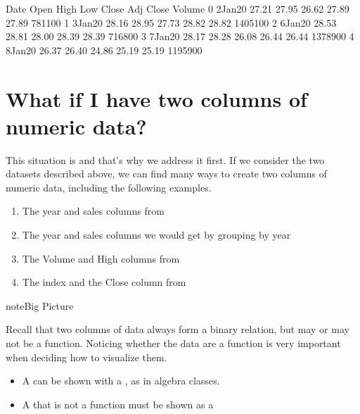 \documentclass[letterpaper,10pt,english]{sphinxmanual}
\begin{document}
\begin{sphinxVerbatim}[commandchars=\\\{\}]
       Date   Open   High    Low  Close  Adj Close   Volume
0  2\PYGZhy{}Jan\PYGZhy{}20  27.21  27.95  26.62  27.89      27.89   781100
1  3\PYGZhy{}Jan\PYGZhy{}20  28.16  28.95  27.73  28.82      28.82  1405100
2  6\PYGZhy{}Jan\PYGZhy{}20  28.53  28.81  28.00  28.39      28.39   716800
3  7\PYGZhy{}Jan\PYGZhy{}20  28.17  28.28  26.08  26.44      26.44  1378900
4  8\PYGZhy{}Jan\PYGZhy{}20  26.37  26.40  24.86  25.19      25.19  1195900
\end{sphinxVerbatim}


\section{What if I have two columns of numeric data?}
\label{\detokenize{chapter-10-visualization:what-if-i-have-two-columns-of-numeric-data}}
This situation is  and that’s why we address it first.  If we consider the two datasets described above, we can find many ways to create two columns of numeric data, including the following examples.
\begin{enumerate}
%
\item {} 
The year and sales columns from 

\item {} 
The year and sales columns we would get by grouping  by year

\item {} 
The Volume and High columns from 

\item {} 
The index and the Close column from 

\end{enumerate}

\begin{sphinxadmonition}{note}{Big Picture}

Recall that two columns of data always form a binary relation, but may or may not be a function.  Noticing whether the data are a function is very important when deciding how to visualize them.
\begin{itemize}
\item {} 
A  can be shown with a , as in algebra classes.

\item {} 
A  that is not a function must be shown as a 

\end{itemize}
\end{sphinxadmonition}
\end{document}
